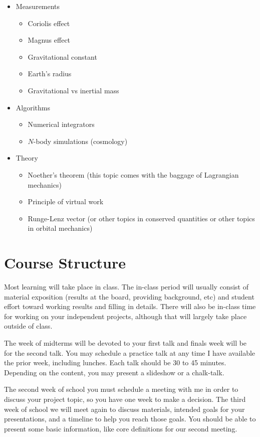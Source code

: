 \documentclass{article}
\begin{document}
\begin{itemize}

\item Measurements
\begin{itemize}
\item Coriolis effect
\item Magnus effect
\item Gravitational constant
\item Earth's radius
\item Gravitational vs inertial mass
\end{itemize}

\item Algorithms
\begin{itemize}
\item Numerical integrators
\item $N$-body simulations (cosmology)
\end{itemize}

\item Theory
\begin{itemize}
\item Noether's theorem (this topic comes with the baggage of Lagrangian mechanics)
\item Principle of virtual work
\item Runge-Lenz vector (or other topics in conserved quantities or other topics in orbital mechanics)
\end{itemize}

\end{itemize}

\section{Course Structure}

Most learning will take place in class.
The in-class period will usually consist of material exposition (results at the board, providing background, etc) and student effort toward working results and filling in details.
There will also be in-class time for working on your independent projects, although that will largely take place outside of class.

The week of midterms will be devoted to your first talk and finals week will be for the second talk.
You may schedule a practice talk at any time I have available the prior week, including lunches.
Each talk should be 30 to 45 minutes.
Depending on the content, you may present a slideshow or a chalk-talk.

The second week of school you must schedule a meeting with me in order to discuss your project topic, so you have one week to make a decision.
The third week of school we will meet again to discuss materials, intended goals for your presentations, and a timeline to help you reach those goals.
You should be able to present some basic information, like core definitions for our second meeting.
\end{document}
